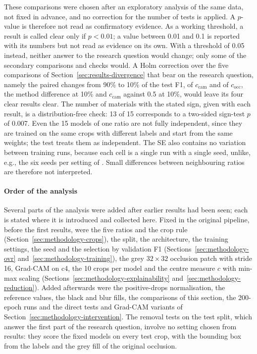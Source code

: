 These comparisons were chosen after an exploratory analysis of the same data, not
fixed in advance, and no correction for the number of tests is applied. A $p$-value is
therefore not read as confirmatory evidence. As a working threshold, a result is called
clear only if $p < 0.01$; a value
between 0.01 and 0.1 is reported with its numbers but not read as evidence on its own.
With a threshold of 0.05 instead, neither answer to the research question would change;
only some of the secondary comparisons and checks would. A Holm correction \citep{holm1979simple} over the five
comparisons of Section~\ref{sec:results-divergence} that bear on the research question,
namely the paired changes from 90\% to 10\% of the test F1, of $c_{\mathrm{cam}}$ and of
$c_{\mathrm{occ}}$, the method difference at 10\% and $c_{\mathrm{cam}}$ against 0.5
at 10\%, would leave its four clear results clear.
The number of materials with the stated sign, given with each result, is a
distribution-free check: 13 of 15 corresponds to a two-sided sign-test $p$ of 0.007.
Even the 15 models of one ratio are not fully independent, since they are trained on
the same crops with different labels and start from the same weights; the test treats
them as independent. The SE also contains no variation between training runs, because
each cell is a single run with a single seed, unlike, e.g., the six seeds per setting
of \citet{pawlowski2019needles}. Small differences between neighbouring
ratios are therefore not interpreted.

\paragraph{Order of the analysis}
Several parts of the analysis were added after earlier results had been seen; each is
stated where it is introduced and collected here. Fixed in the original pipeline, before
the first results, were the five ratios and the crop rule
(Section~\ref{sec:methodology-crops}), the split, the architecture, the training
settings, the seed and the selection by validation F1
(Sections~\ref{sec:methodology-ovr} and~\ref{sec:methodology-training}), the grey
$32 \times 32$ occlusion patch with stride 16, Grad-CAM on c4, the 10 crops per model
and the centre measure $c$ with min-max scaling
(Sections~\ref{sec:methodology-explainability} and~\ref{sec:methodology-reduction}).
Added afterwards were the positive-drops normalisation, the reference values, the black
and blur fills, the comparisons of this section, the 200-epoch runs and the direct
tests and Grad-CAM variants of Section~\ref{sec:methodology-intervention}. The removal
tests on the test split, which answer the first part of the research question, involve
no setting chosen from results: they score the fixed models on every test crop, with the
bounding box from the labels and the grey fill of the original occlusion.

